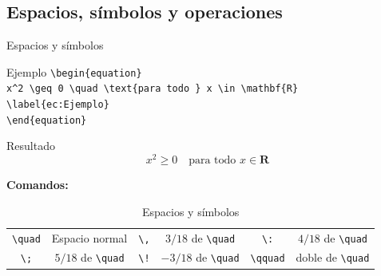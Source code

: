 \documentclass[aspectratio=169, 10pt]{beamer}
\begin{document}
\subsection{Espacios, símbolos y operaciones}
\begin{frame}[fragile]{Espacios y símbolos}
    \begin{exampleblock}{Ejemplo}
        \verb|\begin{equation}|\\
        \hspace{1cm} \verb|x^2 \geq 0 \quad \text{para todo } x \in \mathbf{R}|\\
        \hspace{1cm} \verb|\label{ec:Ejemplo}|\\
        \verb|\end{equation}|
    \end{exampleblock}
    \begin{exampleblock}{Resultado}
        \begin{equation}
        x^2 \geq 0 \quad \text{para todo } x \in \mathbf{R}
        \label{ec:Ejemplo}
    \end{equation}
    \end{exampleblock}
   \textbf{Comandos:}
   \begin{table}[h!]
       \centering
       \begin{tabular}{c c | c c | c c }
           \verb|\quad| & Espacio normal &
           \verb|\,| & $3/18$ de \verb|\quad| &
           \verb|\:| & $4/18$ de \verb|\quad| \\
           \verb|\;| & $5/18$ de \verb|\quad| &
           \verb|\!| & $-3/18$ de \verb|\quad| &
           \verb|\qquad| & doble de \verb|\quad|\\
       \end{tabular}
       \caption{Espacios y símbolos}
       \label{tab:my_label}
   \end{table}

\end{frame}
\end{document}
